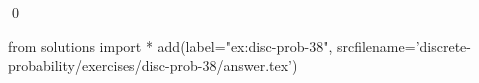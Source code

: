 
\begin{ex} 
  \label{ex:disc-prob-38}
  
  \qed
\end{ex} 
\begin{python0}
from solutions import *
add(label="ex:disc-prob-38",
    srcfilename='discrete-probability/exercises/disc-prob-38/answer.tex') 
\end{python0}
